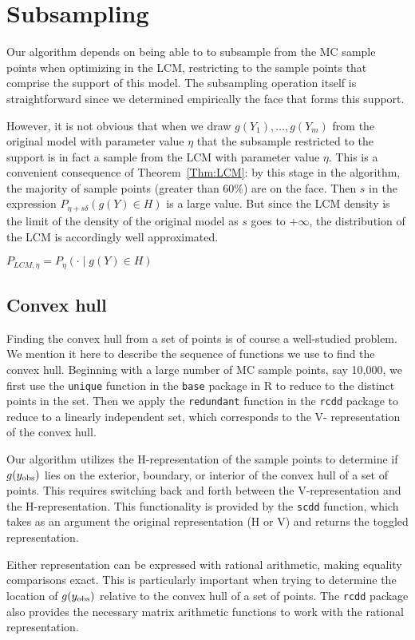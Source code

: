 


\section{Subsampling}
Our algorithm depends on being able to to subsample from the MC sample points when 
optimizing in the LCM, restricting to the sample points that comprise the support of 
this model.  The subsampling operation itself is straightforward since we determined 
empirically the face that forms this support.  

However, it is not obvious that when we draw $g(Y_1), \ldots, g(Y_m)$ from the 
original model with parameter value $\eta$ that the subsample restricted to the 
support is in fact a sample from the LCM with parameter value $\eta$.  This is a 
convenient consequence of Theorem~\ref{Thm:LCM}: by this stage in the algorithm, the 
majority of sample points (greater than 60\%) are on the face.  Then $s$ in the 
expression $P_{\eta + s \delta}(g(Y) \in H)$ is a large value.  But since the LCM 
density is the limit of the density of the original model as $s$ goes to $+\infty$, 
the distribution of the LCM is accordingly well approximated.  

$P_{LCM, \eta} = P_\eta( \cdot \mid g(Y) \in H )$


\subsection{Convex hull}
Finding the convex hull from a set of points is of course a well-studied problem.  We 
mention it here to describe the sequence of functions we use to find the convex hull.  
Beginning with a large number of MC sample points, say 10,000, we first use the 
\texttt{unique} function in the \texttt{base} package in R to reduce to the distinct 
points in the set.  Then we apply the \texttt{redundant} function in the \texttt{rcdd} 
package to reduce to a linearly independent set, which corresponds to the V-
representation of the convex hull.

Our algorithm utilizes the H-representation of the sample points to determine if $g(y_{\text{obs}})$ lies on the 
exterior, boundary, or interior of the convex hull of a set of points.  
This requires switching back and forth between the V-representation and 
the H-representation.  
This functionality is provided by the \texttt{scdd} function, which takes as an 
argument the original representation (H or V) and returns the toggled representation.

Either representation can be expressed with rational arithmetic, making equality 
comparisons exact.  This is particularly important when trying to determine the 
location of $g(y_{\text{obs}})$ relative to the convex hull of a set of points.  The \texttt
{rcdd} package also provides the necessary matrix arithmetic functions to work with 
the rational representation.
